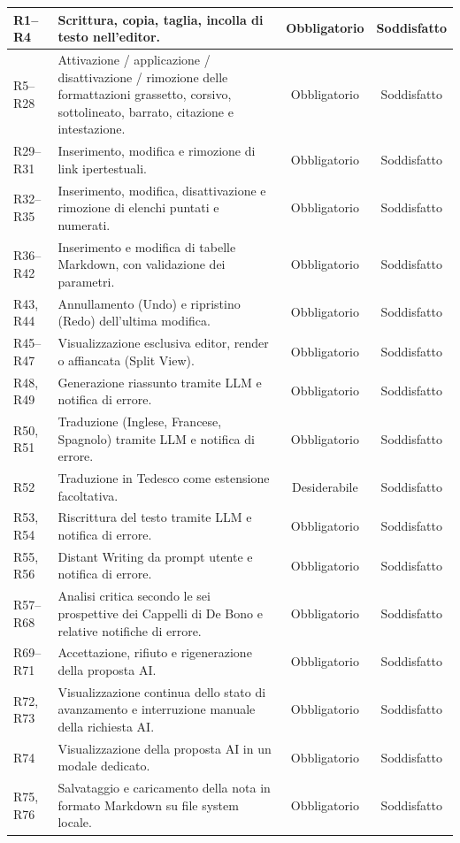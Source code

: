 \begin{xltabular}{\textwidth}{|>{\centering\arraybackslash}p{2.6cm}|X|c|c|}
	R1--R4 & Scrittura, copia, taglia, incolla di testo nell'editor. & Obbligatorio & Soddisfatto \\ \hline
	R5--R28 & Attivazione / applicazione / disattivazione / rimozione delle formattazioni grassetto, corsivo, sottolineato, barrato, citazione e intestazione. & Obbligatorio & Soddisfatto \\ \hline
	R29--R31 & Inserimento, modifica e rimozione di link ipertestuali. & Obbligatorio & Soddisfatto \\ \hline
	R32--R35 & Inserimento, modifica, disattivazione e rimozione di elenchi puntati e numerati. & Obbligatorio & Soddisfatto \\ \hline
	R36--R42 & Inserimento e modifica di tabelle Markdown, con validazione dei parametri. & Obbligatorio & Soddisfatto \\ \hline
	R43, R44 & Annullamento (Undo) e ripristino (Redo) dell'ultima modifica. & Obbligatorio & Soddisfatto \\ \hline
	R45--R47 & Visualizzazione esclusiva editor, render o affiancata (Split View). & Obbligatorio & Soddisfatto \\ \hline
	R48, R49 & Generazione riassunto tramite LLM e notifica di errore. & Obbligatorio & Soddisfatto \\ \hline
	R50, R51 & Traduzione (Inglese, Francese, Spagnolo) tramite LLM e notifica di errore. & Obbligatorio & Soddisfatto \\ \hline
	R52 & Traduzione in Tedesco come estensione facoltativa. & Desiderabile & Soddisfatto \\ \hline
	R53, R54 & Riscrittura del testo tramite LLM e notifica di errore. & Obbligatorio & Soddisfatto \\ \hline
	R55, R56 & Distant Writing da prompt utente e notifica di errore. & Obbligatorio & Soddisfatto \\ \hline
	R57--R68 & Analisi critica secondo le sei prospettive dei Cappelli di De Bono e relative notifiche di errore. & Obbligatorio & Soddisfatto \\ \hline
	R69--R71 & Accettazione, rifiuto e rigenerazione della proposta AI. & Obbligatorio & Soddisfatto \\ \hline
	R72, R73 & Visualizzazione continua dello stato di avanzamento e interruzione manuale della richiesta AI. & Obbligatorio & Soddisfatto \\ \hline
	R74 & Visualizzazione della proposta AI in un modale dedicato. & Obbligatorio & Soddisfatto \\ \hline
	R75, R76 & Salvataggio e caricamento della nota in formato Markdown su file system locale. & Obbligatorio & Soddisfatto \\ \hline

\end{xltabular}

